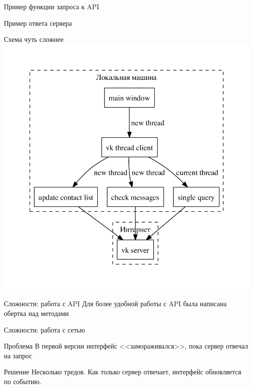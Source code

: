 \documentclass{beamer}
\begin{document}
\begin{frame}{Пример функции запроса к API}

\end{frame}


\begin{frame}{Пример ответа сервера}

\end{frame}

\begin{frame}{Схема чуть сложнее}
\includegraphics[width=\textwidth, height=\textheight]{./pics/complex.pdf}
\end{frame}

\begin{frame}{Сложности: работа с API}
Для более удобной работы с API была написана обертка над методами
\end{frame}

\begin{frame}{Сложности: работа с сетью}

\begin{block}{Проблема}
В первой версии интерфейс <<замораживался>>, пока сервер отвечал на запрос
\end{block}

\begin{block}{Решение}
Несколько тредов. Как только сервер отвечает, интерфейс обновляется по событию.
\end{block}

\end{frame}
\end{document}
